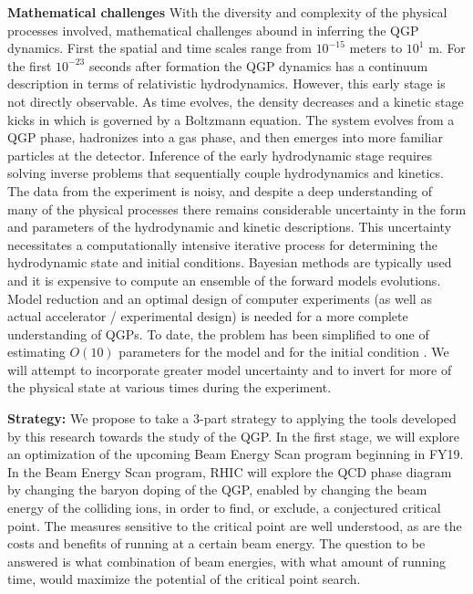 \documentclass[11pt]{article}
\begin{document}
{\bf Mathematical challenges}  With the diversity
and complexity of the physical processes involved, mathematical
challenges abound in inferring the QGP dynamics.  First the spatial
and time scales range from $10^{-15}$ meters to $10^{1}$ m.  For the
first $10^{-23}$ seconds after formation the QGP dynamics has a
continuum description in terms of relativistic hydrodynamics.
However, this early stage is not directly observable.  As time
evolves, the density decreases and a kinetic stage kicks in which is
governed by a Boltzmann equation.  The system evolves from a QGP
phase, hadronizes into a gas phase, and then emerges into more
familiar particles at the detector.  Inference of the early
hydrodynamic stage requires solving inverse problems that sequentially
couple hydrodynamics and kinetics.  The data from the experiment is
noisy, and despite a deep understanding of many of the physical
processes there remains considerable uncertainty in the form and
parameters of the hydrodynamic and kinetic descriptions.  This
uncertainty necessitates a computationally intensive iterative process
for determining the hydrodynamic state and initial conditions.
Bayesian methods are typically used and it is expensive to compute an
ensemble of the forward models evolutions.  Model reduction and an
optimal design of computer experiments (as well as actual accelerator
/ experimental design) is needed for a more complete understanding of
QGPs. To date, the problem has been simplified to one of estimating
$O(10)$ parameters for the model and for the initial
condition \cite{bernhard2016applying, bernhard2015quantifying,
auvinen2016systematic, bernhard2017characterization,
bass2017determination}.  We will attempt to incorporate greater model
uncertainty and to invert for more of the physical state at various
times during the experiment.

{\bf Strategy:}
We propose to take a 3-part strategy to applying the tools
developed by this research towards the study of the QGP.
In the first stage, we will explore an optimization of the 
upcoming Beam Energy Scan program beginning in FY19.
In the Beam Energy Scan program, RHIC will 
explore the QCD phase diagram by changing the baryon doping 
of the QGP, enabled by changing the beam energy of
the colliding ions, in order to find, or exclude, a conjectured
critical point.  The measures sensitive to the critical point
are well understood, as are the costs and benefits of running
at a certain beam energy.  The question to be answered is 
what combination of beam energies, with what amount of
running time, would maximize the potential of the critical
point search.
\end{document}
